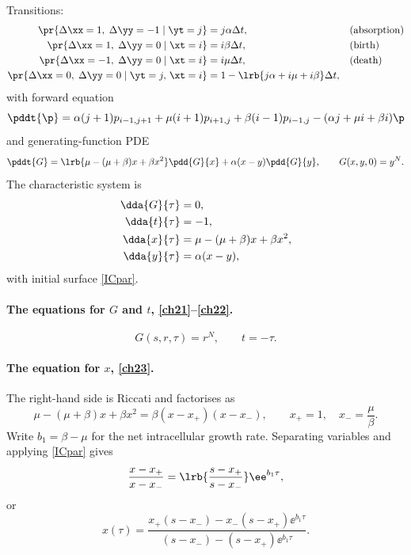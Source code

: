 Transitions:
\begin{align*}
     \pr{\Delta\xx= 1,\;\Delta\yy = -1 \;|\; \yt = j} &= j \alpha \Delta t,  &&\text{(absorption)}\\
     \pr{\Delta\xx= 1,\;\Delta\yy = 0 \;|\; \xt = i} &= i \beta \Delta t,  &&\text{(birth)}\\
      \pr{\Delta\xx= -1,\;\Delta\yy = 0 \;|\; \xt = i} &= i \mu \Delta t,  &&\text{(death)}\\
     \pr{\Delta\xx= 0,\;\Delta\yy = 0 \;|\; \yt = j,\, \xt=i} &= 1 -  \lrb{ j\alpha + i\mu + i\beta}\Delta t,
\end{align*}
with forward equation
\begin{equation}
\label{FK3}
\pddt{\p} = \alpha(j+1)p_{i-1,j+1} + \mu(i+1)p_{i+1,j} + \beta(i-1)p_{i-1,j} - (\alpha j + \mu i + \beta i)\p
\end{equation}
and generating-function PDE
\begin{equation}
\label{PDE3}
\pddt{G} = \lrb{\mu - (\mu+\beta)x + \beta x^2}\pdd{G}{x} + \alpha(x-y)\pdd{G}{y},
\qquad G(x,y,0) = y^N .
\end{equation}
The characteristic system is
\begin{align}
\dda{G}{\tau} &= 0, \label{ch21}\\
\dda{t}{\tau} &= -1, \label{ch22}\\
\dda{x}{\tau} &= \mu-(\mu+\beta)x + \beta x^2, \label{ch23}\\
\dda{y}{\tau} &= \alpha(x-y), \label{ch24}
\end{align}
with initial surface \cref{ICpar}.

\paragraph{The equations for \(G\) and \(t\), \eqref{ch21}--\eqref{ch22}.}
\begin{equation}
\label{gngngn}
G(s,r,\tau) = r^N,
\qquad t = -\tau .
\end{equation}

\paragraph{The equation for \(x\), \eqref{ch23}.}
The right-hand side is Riccati and factorises as
\begin{equation}
\label{eq:xpm}
\mu - (\mu+\beta)x + \beta x^2 = \beta(x-x_+)(x-x_-),
\qquad
x_+ = 1,\quad x_- = \frac{\mu}{\beta}.
\end{equation}
Write \(b_1=\beta-\mu\) for the net intracellular growth rate. Separating variables and applying \cref{ICpar} gives
\begin{equation}
\label{eq:xratio}
\frac{x-x_+}{x-x_-} = \lrb{\frac{s-x_+}{s-x_-}}\ee^{b_1\tau},
\end{equation}
or
\begin{equation}
\label{xabd}
x(\tau) = \frac{x_+(s-x_-) - x_-(s-x_+)\ee^{b_1\tau}}{(s-x_-) - (s-x_+)\ee^{b_1\tau}} .
\end{equation}

